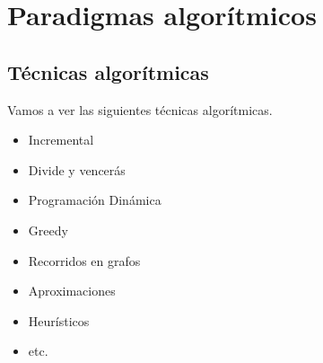\documentclass[AL.tex]{subfiles}
\begin{document}
\chapter{Paradigmas algorítmicos}
\section{Técnicas algorítmicas}
Vamos a ver las siguientes técnicas algorítmicas.
\begin{itemize}
\item Incremental
\item Divide y vencerás
\item Programación Dinámica
\item Greedy
\item Recorridos en grafos
\item Aproximaciones
\item Heurísticos
\item etc.
\end{itemize}
\end{document}
